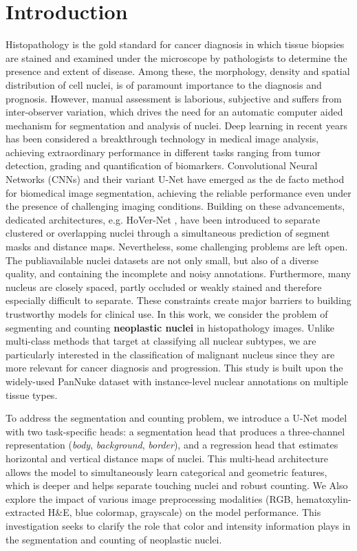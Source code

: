 \documentclass[target=bach,aauheader=,style=]{thud}
\begin{document}
\chapter{Introduction}
\label{sec:introduction}
Histopathology is the gold standard for cancer diagnosis in which tissue biopsies are stained and examined under the microscope by pathologists to determine the presence and extent of disease. Among these, the morphology, density and spatial distribution of cell nuclei, is of paramount importance to the diagnosis and prognosis. However, manual assessment is laborious, subjective and suffers from inter-observer variation, which drives the need for an automatic computer aided mechanism for segmentation and analysis of nuclei.
Deep learning in recent years has been considered a breakthrough technology in medical image analysis, achieving extraordinary performance in different tasks ranging from tumor detection, grading and quantification of biomarkers. Convolutional Neural Networks (CNNs) and their variant U-Net have emerged as the de facto method for biomedical image segmentation, achieving the reliable performance even under the presence of challenging imaging conditions. Building on these advancements, dedicated architectures, e.g. HoVer-Net \cite{graham2019hovernet}, have been introduced to separate clustered or overlapping nuclei through a simultaneous prediction of segment masks and distance maps.
Nevertheless, some challenging problems are left open. The publiavailable nuclei datasets are not only small, but also of a diverse quality, and containing the incomplete and noisy annotations. Furthermore, many nucleus are closely spaced, partly occluded or weakly stained and therefore especially difficult to separate. These constraints create major barriers to building trustworthy models for clinical use.
In this work, we consider the problem of segmenting and counting \textbf{neoplastic nuclei} in histopathology images. Unlike multi-class methods that target at classifying all nuclear subtypes, we are particularly interested in the classification of malignant nucleus since they are more relevant for cancer diagnosis and progression. This study is built upon the widely-used PanNuke dataset \cite{gamper2019pannuke,gamper2020pannuke} with instance-level nuclear annotations on multiple tissue types.

To address the segmentation and counting problem, we introduce a U-Net model with two task-specific heads: a segmentation head that produces a three-channel representation (\textit{body}, \textit{background}, \textit{border}), and a regression head that estimates horizontal and vertical distance maps of nuclei. This multi-head architecture allows the model to simultaneously learn categorical and geometric features, which is deeper and helps separate touching nuclei and robust counting.
We Also explore the impact of various image preprocessing modalities (RGB, hematoxylin-extracted H\&E, blue colormap, grayscale) on the model performance. This investigation seeks to clarify the role that color and intensity information plays in the segmentation and counting of neoplastic nuclei.
\end{document}
